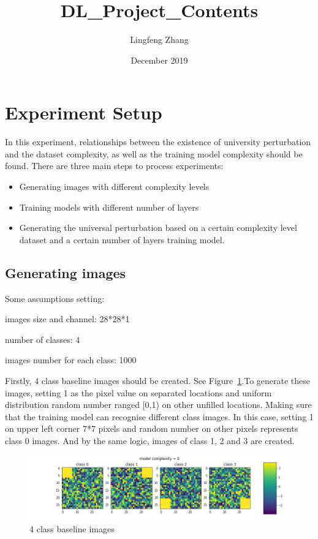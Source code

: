 \documentclass{article}
\title{DL\_Project\_Contents}
\author{Lingfeng Zhang}
\date{December 2019}
\begin{document}
\maketitle

\section{Experiment Setup}

In this experiment, relationships between the existence of university perturbation and the dataset complexity, as well as the training model complexity should be found. There are three main steps to process experiments:

\begin{itemize}
    \item Generating images with different complexity levels
    \item Training models with different number of layers
    \item Generating the universal perturbation based on a certain complexity level dataset and a certain number of layers training model. 
\end{itemize}

\subsection{Generating images}

Some assumptions setting: 

images size and channel: 28*28*1

number of classes: 4

images number for each class: 1000

Firstly, 4 class baseline images should be created. See Figure~\ref{fig:baseline_image}.To generate these images, setting 1 as the pixel value on separated locations and uniform distribution random number ranged [0,1) on other unfilled locations. Making sure that the training model can recognise different class images. In this case, setting 1 on upper left corner 7*7 pixels and random number on other pixels represents class 0 images. And by the same logic, images of class 1, 2 and 3 are created. 
\begin{figure}[h]
    \centering
    \includegraphics[width=1\linewidth]{demo-0.png}
    \caption{\small 4 class baseline images}
    \label{fig:baseline_image}
\end{figure}
\end{document}

